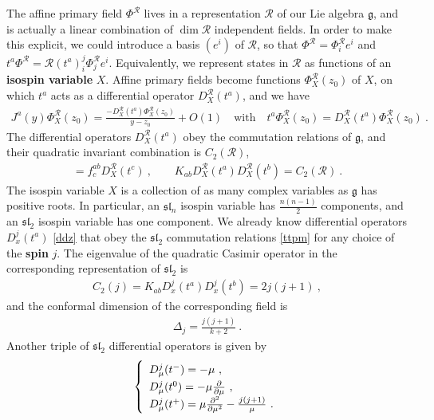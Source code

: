 \documentclass[12pt, a4paper, notitlepage, twoside]{report}
\numberwithin{equation}{section}
\theoremstyle{break}
\begin{document}
The affine primary field $\Phi^\mathcal{R}$ lives in a representation $\mathcal{R}$ of our Lie algebra $\mathfrak{g}$, and is actually a linear combination of $\dim \mathcal{R}$ independent fields. 
In order to make this explicit, we could introduce a basis $(e^i)$ of $\mathcal{R}$, so that $\Phi^{\mathcal{R}} = \Phi^{\mathcal{R}}_ie^i$ and $t^a \Phi^{\mathcal{R}} = \mathcal{R}(t^a)_i^j \Phi^{\mathcal{R}}_je^i$.
Equivalently, we represent states in $\mathcal{R}$ 
as functions of an \textbf{\boldmath isospin variable} $X$. 
Affine primary fields become functions $\Phi^\mathcal{R}_X(z_0)$ of $X$, on which $t^a$ acts as a differential operator $D_X^\mathcal{R}(t^a)$, 
and we have
\begin{align}
 J^a(y)\Phi^\mathcal{R}_X(z_0) = \frac{-D^\mathcal{R}_X(t^a)\Phi^\mathcal{R}_X(z_0)}{y-z_0}+O(1)\quad \text{with} \quad t^a \Phi^\mathcal{R}_X(z_0) = D_X^\mathcal{R}(t^a) \Phi^\mathcal{R}_X(z_0)\ .
\label{jprx}
\end{align}
The differential operators $D_X^\mathcal{R}(t^a)$ obey the commutation relations of $\mathfrak{g}$, and their quadratic invariant combination is $C_2(\mathcal{R})$,
\begin{align}
[D_X^\mathcal{R}(t^a),D_X^\mathcal{R}(t^b)] = f^{ab}_c D_X^\mathcal{R}(t^c)\ , \qquad K_{ab} D_X^\mathcal{R}(t^a)D_X^\mathcal{R}(t^b) = C_2(\mathcal{R})\ .
\label{dta}
\end{align}
The isospin variable $X$ is a collection of as many complex variables as $\mathfrak{g}$ has positive roots.
In particular, an $\mathfrak{sl}_n$ isospin variable has $\frac{n(n-1)}{2}$ components, and an $\mathfrak{sl}_2$ isospin variable has one component.
We already know differential operators $D^j_x(t^a)$ \eqref{ddz} that 
obey the $\mathfrak{sl}_2$ commutation relations \eqref{ttpm} for any choice of the 
\textbf{\boldmath spin} $j$.
The eigenvalue of the quadratic Casimir operator in the corresponding representation of $\mathfrak{sl}_2$ is
\begin{align}
 C_2(j) =  K_{ab}D_x^j(t^a)D_x^j(t^b) = 2j(j+1)\ ,
\end{align}
and the conformal dimension of the corresponding field is
\begin{align}
 \Delta_j =\frac{j(j+1)}{k+2}\ .
\label{dj}
\end{align}
Another triple of $\mathfrak{sl}_2$ differential operators is given by 
\begin{align}
\renewcommand{\arraystretch}{1.3}
\left\{\begin{array}{l}  
 D_\mu^j(t^-) = -\mu \ , \\  D_\mu^j(t^0) = -\mu{\frac{\partial}{\partial \mu}} \ , \\ D_\mu^j(t^+) = \mu\frac{\partial^2}{\partial\mu^2} -\frac{j(j+1)}{\mu}\ . \end{array}\right. 
\label{mub}
\end{align}
\end{document}
